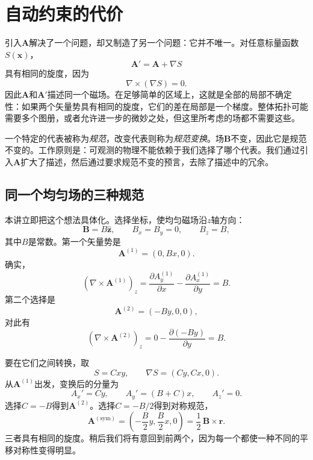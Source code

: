 \section{自动约束的代价}

引入\(\mathbf A\)解决了一个问题，却又制造了另一个问题：它并不唯一。对任意标量函数\(S(\mathbf x)\)，
\begin{equation}
  \mathbf A'=\mathbf A+\nabla S
\end{equation}
具有相同的旋度，因为
\begin{equation}
  \nabla\times(\nabla S)=0.
\end{equation}
因此\(\mathbf A\)和\(\mathbf A'\)描述同一个磁场。在足够简单的区域上，这就是全部的局部不确定性：如果两个矢量势具有相同的旋度，它们的差在局部是一个梯度。整体拓扑可能需要多个图册，或者允许进一步的微妙之处，但这里所考虑的场都不需要这些。

一个特定的代表被称为\emph{规范}，改变代表则称为\emph{规范变换}。场\(\mathbf B\)不变，因此它是规范不变的。工作原则是：可观测的物理不能依赖于我们选择了哪个代表。我们通过引入\(\mathbf A\)扩大了描述，然后通过要求规范不变的预言，去除了描述中的冗余。

\subsection{同一个均匀场的三种规范}

本讲立即把这个想法具体化。选择坐标，使均匀磁场沿\(z\)轴方向：
\begin{equation}
  \mathbf B=B\hat{\mathbf z},
  \qquad
  B_x=B_y=0,
  \qquad
  B_z=B,
\end{equation}
其中\(B\)是常数。第一个矢量势是
\begin{equation}
  \mathbf A^{(1)}=(0,Bx,0).
\end{equation}
确实，
\begin{equation}
  (\nabla\times\mathbf A^{(1)})_z
  =
  \frac{\partial A_y^{(1)}}{\partial x}
  -
  \frac{\partial A_x^{(1)}}{\partial y}
  =B.
\end{equation}
第二个选择是
\begin{equation}
  \mathbf A^{(2)}=(-By,0,0),
\end{equation}
对此有
\begin{equation}
  (\nabla\times\mathbf A^{(2)})_z
  =
  0-\frac{\partial(-By)}{\partial y}
  =B.
\end{equation}

要在它们之间转换，取
\begin{equation}
  S=Cxy,
  \qquad
  \nabla S=(Cy,Cx,0).
\end{equation}
从\(\mathbf A^{(1)}\)出发，变换后的分量为
\begin{equation}
  A_x'=Cy,
  \qquad
  A_y'=(B+C)x,
  \qquad
  A_z'=0.
\end{equation}
选择\(C=-B\)得到\(\mathbf A^{(2)}\)。选择\(C=-B/2\)得到对称规范，
\begin{equation}
  \mathbf A^{(\mathrm{sym})}
  =
  \left(-\frac{B}{2}y,\frac{B}{2}x,0\right)
  =
  \frac12\,\mathbf B\times\mathbf r.
\end{equation}
三者具有相同的旋度。稍后我们将有意回到前两个，因为每一个都使一种不同的平移对称性变得明显。

